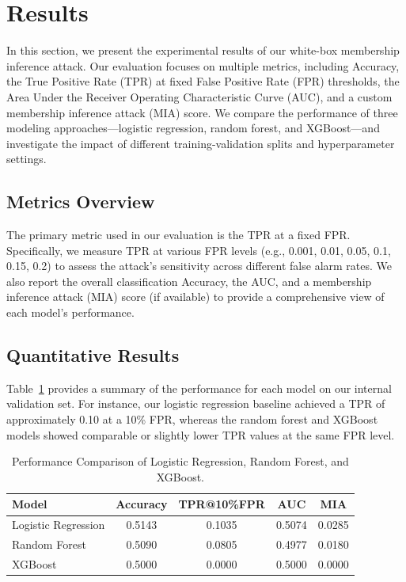 \documentclass[12pt]{article}
\begin{document}
\section{Results}
\label{sec:results}
In this section, we present the experimental results of our white-box membership inference attack. Our evaluation focuses on multiple metrics, including Accuracy, the True Positive Rate (TPR) at fixed False Positive Rate (FPR) thresholds, the Area Under the Receiver Operating Characteristic Curve (AUC), and a custom membership inference attack (MIA) score. We compare the performance of three modeling approaches—logistic regression, random forest, and XGBoost—and investigate the impact of different training-validation splits and hyperparameter settings.

\subsection{Metrics Overview}
The primary metric used in our evaluation is the TPR at a fixed FPR. Specifically, we measure TPR at various FPR levels (e.g., 0.001, 0.01, 0.05, 0.1, 0.15, 0.2) to assess the attack’s sensitivity across different false alarm rates. We also report the overall classification Accuracy, the AUC, and a membership inference attack (MIA) score (if available) to provide a comprehensive view of each model’s performance.

\subsection{Quantitative Results}
Table~\ref{tab:results} provides a summary of the performance for each model on our internal validation set. For instance, our logistic regression baseline achieved a TPR of approximately 0.10 at a 10\% FPR, whereas the random forest and XGBoost models showed comparable or slightly lower TPR values at the same FPR level.

\begin{table}[h!]
\centering
\caption{Performance Comparison of Logistic Regression, Random Forest, and XGBoost.}
\label{tab:results}
\begin{tabular}{lcccc}
\toprule
\textbf{Model} & \textbf{Accuracy} & \textbf{TPR@10\%FPR} & \textbf{AUC} & \textbf{MIA} \\
\midrule
Logistic Regression & 0.5143 & 0.1035 & 0.5074 & 0.0285 \\
Random Forest       & 0.5090 & 0.0805 & 0.4977 & 0.0180 \\
XGBoost             & 0.5000 & 0.0000 & 0.5000 & 0.0000 \\
\bottomrule
\end{tabular}
\end{table}
\end{document}

